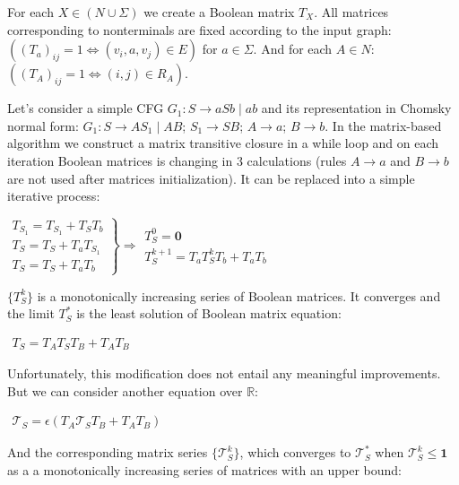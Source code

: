 \documentclass[sigconf]{acmart}
\begin{document}
For each $X \in (N \cup \Sigma)$ we create a Boolean matrix $T_X$. 
All matrices corresponding to nonterminals are fixed according to the input graph: $((T_a)_{ij} = 1 \iff (v_i, a, v_j) \in E)$ for $a \in \Sigma$. 
And for each $A \in N$: $((T_A)_{ij} = 1 \iff (i, j) \in R_A)$.


Let's consider a simple CFG $G_1 : S \rightarrow aSb \mid ab$ and its representation in Chomsky normal form: $G_1 : S \rightarrow AS_1 \mid AB$; $ S_1 \rightarrow SB$; $ A \rightarrow a$; $B \rightarrow b$.
In the matrix-based algorithm we construct a matrix transitive closure in a while loop and on each iteration Boolean matrices is changing in 3 calculations (rules $ A \rightarrow a$ and $B \rightarrow b$ are not used after matrices initialization). It can be replaced into a simple iterative process:

\begin{center}
\(
\left. 
\begin{array}{l}
T_{S_1} = T_{S_1} + T_ST_b \\
T_S = T_S + T_aT_{S_1} \\ 
T_S = T_S + T_aT_b
\end{array} 
\right\}
\Rightarrow 
\left. 
\begin{array}{l}
T_S^0 = \mathbf{0} \\
T_S^{k+1} = T_a T_S^k T_b + T_a T_b
\end{array} 
\right.
\)
\end{center}

$\{ T_S^k\}$ is a monotonically increasing series of Boolean matrices. 
It converges and the limit $T_S^*$ is the least solution of Boolean matrix equation:

\begin{center}
\(
\left. 
\begin{array}{l}
T_S = T_AT_ST_B + T_AT_B
\end{array} 
\right.
\)
\end{center}

Unfortunately, this modification does not entail any meaningful improvements. 
But we can consider another equation over $\mathbb{R}$:

\begin{center}
\(
\left. 
\begin{array}{l}
\mathcal{T}_S = \epsilon(T_A \mathcal{T}_S T_B + T_A T_B)
\end{array}
\right.
\)
\end{center}

And the corresponding matrix series $\{ \mathcal{T}_S^{k}\}$, which converges to $\mathcal{T}_S^*$ when $\mathcal{T}_S^{k} \leq \textbf{1}$ as a a monotonically increasing series of matrices with an upper bound:
\end{document}
